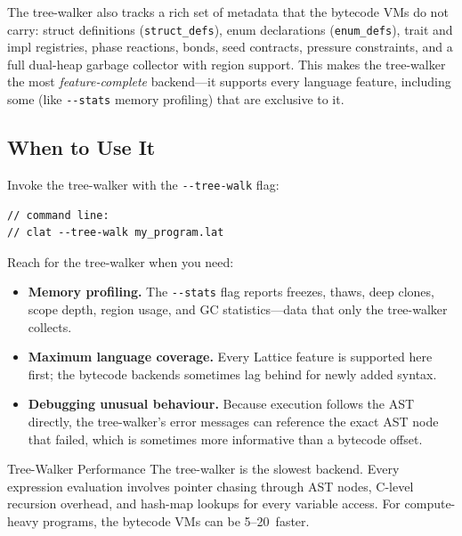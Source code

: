 The tree-walker also tracks a rich set of metadata that the bytecode VMs do
not carry: struct definitions (\lstinline|struct_defs|), enum declarations
(\lstinline|enum_defs|), trait and impl registries, phase reactions, bonds,
seed contracts, pressure constraints, and a full dual-heap garbage collector
with region support. This makes the tree-walker the most \emph{feature-complete}
backend---it supports every language feature, including some (like
\lstinline|--stats| memory profiling) that are exclusive to it.

\subsection{When to Use It}

Invoke the tree-walker with the \lstinline|--tree-walk| flag:

\begin{lstlisting}[language=Lattice, caption={Running with the tree-walk backend}]
// command line:
// clat --tree-walk my_program.lat
\end{lstlisting}

Reach for the tree-walker when you need:

\begin{itemize}
  \item \textbf{Memory profiling.}  The \lstinline|--stats| flag reports
        freezes, thaws, deep clones, scope depth, region usage, and GC
        statistics---data that only the tree-walker collects.
  \item \textbf{Maximum language coverage.}  Every Lattice feature is supported
        here first; the bytecode backends sometimes lag behind for newly added
        syntax.
  \item \textbf{Debugging unusual behaviour.}  Because execution follows the
        AST directly, the tree-walker's error messages can reference the exact
        AST node that failed, which is sometimes more informative than a bytecode
        offset.
\end{itemize}

\begin{warnbox}{Tree-Walker Performance}
The tree-walker is the slowest backend. Every expression evaluation involves
pointer chasing through AST nodes, C-level recursion overhead, and hash-map
lookups for every variable access. For compute-heavy programs, the bytecode
VMs can be 5--20\texttimes\ faster.
\end{warnbox}

